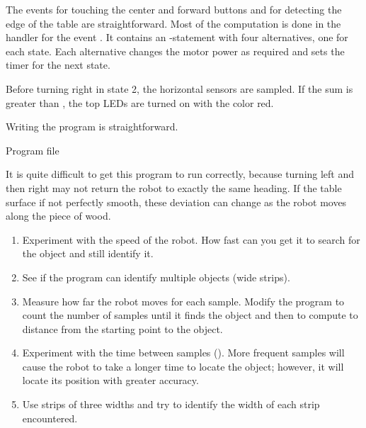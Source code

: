 
The events for touching the center and forward buttons and for detecting
the edge of the table are straightforward. Most of the computation is done
in the handler for the event . It contains an -statement
with four alternatives, one for each state. Each alternative changes the
motor power as required and sets the timer for the next state.

Before turning right in state 2, the horizontal sensors are sampled.
If the sum is greater than , the top LEDs are turned on
with the color red.



Writing the program is straightforward.

{\raggedleft \hfill Program file }


It is quite difficult to get this program to run correctly,
because turning left and then right may not return the robot
to exactly the same heading. If the table surface if not perfectly
smooth, these deviation can change as the robot moves along the piece of wood.


\begin{enumerate}

\item Experiment with the speed of the robot. How fast can you get it to
search for the object and still identify it.

\item See if the program can identify multiple objects (wide strips).

\item Measure how far the robot moves for each sample.
Modify the program to count the number of samples until it finds the object
and then to compute to distance from the starting point to the object.

\item Experiment with the time between samples ().
More frequent samples will cause the robot to take a longer time
to locate the object; however, it will locate its position
with greater accuracy.

\item Use strips of three widths and try to identify the width of
each strip encountered.

\end{enumerate}
